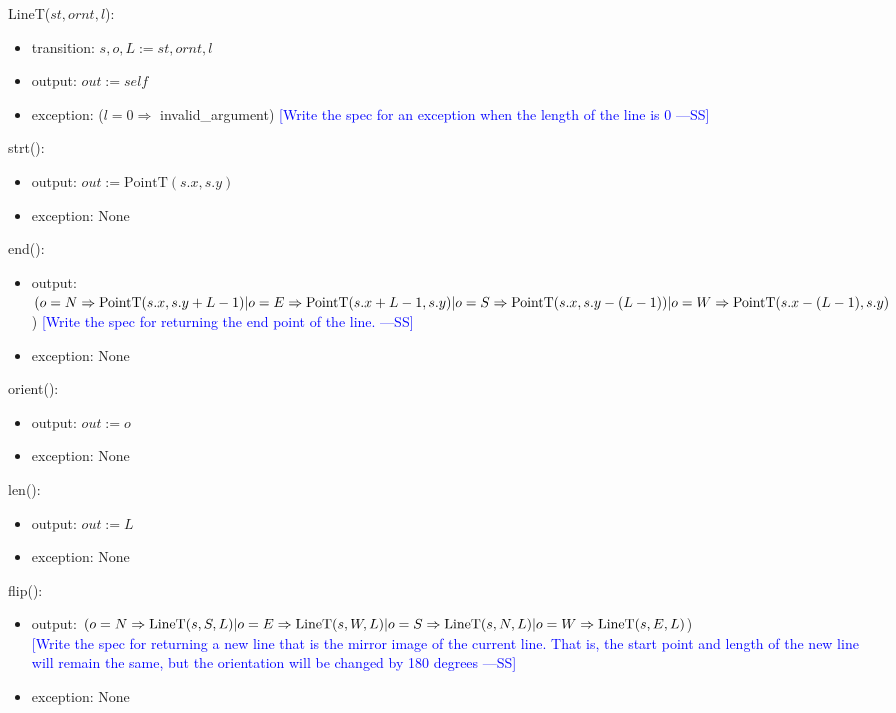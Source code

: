 \documentclass[12pt]{article}
\newcommand{\authornote}[3]{\textcolor{#1}{[#3 ---#2]}}
\newcommand{\authornote}[3]{}
\newcommand{\wss}[1]{\authornote{blue}{SS}{#1}}
\begin{document}
LineT($st, ornt, l$):
\begin{itemize}
\item transition: $s, o, L := st, ornt, l$
\item output: $out := \mathit{self}$
\item exception: ($l = 0 \Rightarrow $ invalid\_argument) \wss{Write the spec for an exception when the length of the line is 0}
\end{itemize}

\noindent strt():
\begin{itemize}
\item output: $out := \mbox{PointT}(s.x, s.y)$
\item exception: None
\end{itemize}

\noindent end():
\begin{itemize}
\item output: $(o = N \Rightarrow \mbox{PointT}(s.x, s.y + L-1) | o = E \Rightarrow \mbox{PointT}(s.x + L-1, s.y) \\ 
| o = S \Rightarrow \mbox{PointT}(s.x, s.y - (L - 1)) | o = W \Rightarrow \mbox{PointT}(s.x - (L - 1), s.y)$)
 \wss{Write the spec for returning the end point of the
    line.}

\item exception: None
\end{itemize}

\noindent orient():
\begin{itemize}
\item output: $out := o$
\item exception: None
\end{itemize}

\noindent len():
\begin{itemize}
\item output: $out := L$
\item exception: None
\end{itemize}

\noindent flip():
\begin{itemize}
\item output: 
$(o = N \Rightarrow \mbox{LineT}(s, S, L) | o = E \Rightarrow \mbox{LineT}(s, W, L) \\ 
| o = S \Rightarrow \mbox{LineT}(s, N, L) | o = W \Rightarrow \mbox{LineT}(s, E, L) $)
\\
\wss{Write the spec for returning a new line that is the mirror
    image of the current line.  That is, the start point and length of the new
    line will remain the same, but the orientation will be changed by 180
    degrees}
\item exception: None
\end{itemize}
\end{document}
